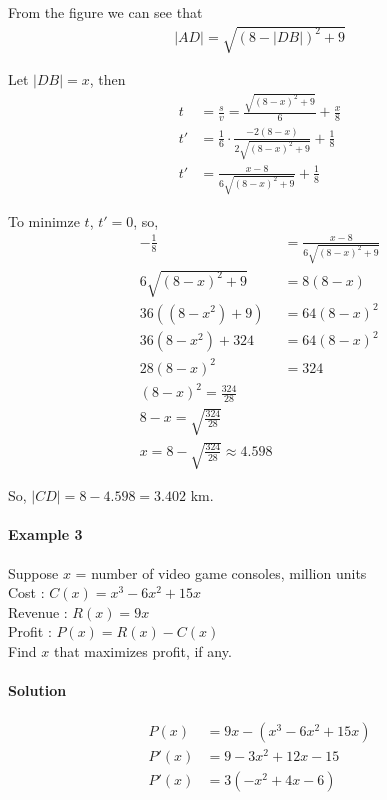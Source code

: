 \documentclass[12pt]{article}
\begin{document}
From the figure we can see that 
\begin{align*} 
     |AD| = \sqrt{(8 - |DB|)^2 + 9}
\end{align*}

Let $|DB| = x$, then 
\begin{align*} 
    t &= \frac{s}{v} = \frac{\sqrt{(8 - x)^2 + 9}}{6} + \frac{x}{8} \\
    t' &= \frac{1}{6} \cdot \frac{ -2(8 - x)}{2 \sqrt{(8 - x)^2 + 9}} + \frac{1}{8} \\
    t' &= \frac{x - 8}{6 \sqrt{(8 - x)^2 + 9}} + \frac{1}{8} 
\end{align*}

To minimze $t$, $t' = 0$, so, 
\begin{align*} 
     - \frac{1}{8} &= \frac{x - 8}{6 \sqrt{(8 - x)^2 + 9}} \\
     6 \sqrt{(8 - x)^2 + 9} &= 8(8 - x)\\
     36((8 - x^2) + 9) &= 64(8 - x)^2 \\
     36(8 - x^2) + 324 &= 64(8 - x)^2 \\
     28(8 - x)^2 &= 324 \\
     (8 - x)^2 = \frac{324}{28} \\
     8 - x = \sqrt{\frac{324}{28}} \\
     x = 8 - \sqrt{\frac{324}{28}} \approx 4.598
\end{align*}

So, $|CD| = 8 - 4.598 = 3.402$ km.

\paragraph{Example 3}
Suppose $x$ = number of video game consoles, million units \\
Cost : $C(x) = x^3 - 6x^2 + 15x$ \\
Revenue : $R(x) = 9x$ \\
Profit : $P(x) = R(x) - C(x)$ \\
Find $x$ that maximizes profit, if any.

\paragraph{Solution}
\begin{align*} 
     P(x) &= 9x - (x^3 - 6x^2 + 15x) \\
     P'(x) &= 9 - 3x^2 + 12x - 15 \\
     P'(x) &= 3(- x^2 + 4x - 6) \\
\end{align*}
\end{document}
